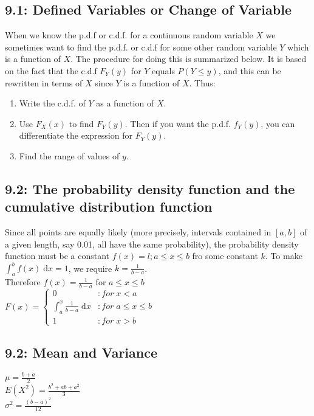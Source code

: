 \documentclass[11pt]{article}
\begin{document}
     	\subsection*{9.1: Defined Variables or Change of Variable}
     		When we know the p.d.f or c.d.f. for a continuous random variable $X$ we sometimes want to find the p.d.f. or c.d.f for some other random variable $Y$ which is a function of $X$. The procedure for doing this is summarized below. It is based on the fact that the c.d.f $F_Y(y)$ for $Y$ equals $P(Y\leq y)$, and this can be rewritten in terms of $X$ since $Y$ is a function of $X$. Thus:\\
     		\begin{enumerate}
     			\item Write the c.d.f. of $Y$ as a function of $X$.
     			\item Use $F_X(x)$ to find $F_Y(y)$. Then if you want the p.d.f. $f_Y(y)$, you can differentiate the expression for $F_Y(y)$.
     			\item Find the range of values of $y$.
     		\end{enumerate}
     	
     	\subsection*{9.2: The probability density function and the cumulative distribution function}
     		Since all points are equally likely (more precisely, intervals contained in $[a,b]$ of a given length, say 0.01, all have the same probability), the probability density function must be a constant $f(x)=l;a\leq x \leq b$ fro some constant $k$. To make $\int_a^b \! f(x) \; \mathrm{d}x = 1$, we require $k = \frac{1}{b-a}$.\\
     		Therefore $f(x)= \frac{1}{b-a}$ for $a \leq x \leq b$\\
     		$F(x) = \left\{
     		\begin{array}{lr}
     		 0 & : for\; x< a\\
     		 \int_a^x \! \frac{1}{b-a} \; \mathrm{d}x & : for\; a \leq x \leq b \\
     		 1 & : for\; x > b
     		
     		\end{array}
     		\right.$
     		
     	\subsection*{9.2: Mean and Variance}
     		$\mu = \frac{b+a}{2}$\\
     		$E(X^2)=\frac{b^2+ab+a^2}{3}$\\
     		$\sigma^2 = \frac{(b-a)^2}{12}$
     	
\end{document}

